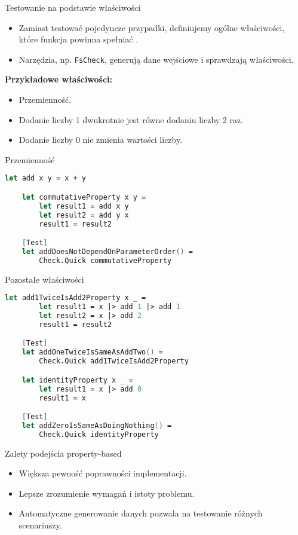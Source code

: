\begin{frame}{Testowanie na podstawie właściwości}
    \begin{itemize}
        \item Zamiast testować pojedyncze przypadki, definiujemy ogólne właściwości, które funkcja powinna spełniać \cite{pbt_bib}.
        \item Narzędzia, np. \texttt{FsCheck}, generują dane wejściowe i sprawdzają właściwości.
    \end{itemize}
    \textbf{Przykładowe właściwości:}
    \begin{itemize}
        \item Przemienność.
        \item Dodanie liczby 1 dwukrotnie jest równe dodaniu liczby 2 raz.
        \item Dodanie liczby 0 nie zmienia wartości liczby.
    \end{itemize}
\end{frame}


\begin{frame}[fragile]{Przemienność}
    \begin{lstlisting}[language=FSharp, xleftmargin=-10pt,xrightmargin=-10pt,numbers=none]
    let add x y = x + y

    let commutativeProperty x y =
        let result1 = add x y
        let result2 = add y x 
        result1 = result2

    [Test]
    let addDoesNotDependOnParameterOrder() =
        Check.Quick commutativeProperty
    \end{lstlisting}
\end{frame}

\begin{frame}[fragile]{Pozostałe właściwości}
    \begin{lstlisting}[language=FSharp, xleftmargin=-10pt,xrightmargin=-10pt,numbers=none, basicstyle=\ttfamily\small]
    let add1TwiceIsAdd2Property x _ =
        let result1 = x |> add 1 |> add 1
        let result2 = x |> add 2
        result1 = result2

    [Test]
    let addOneTwiceIsSameAsAddTwo() =
        Check.Quick add1TwiceIsAdd2Property

    let identityProperty x _ =
        let result1 = x |> add 0
        result1 = x

    [Test]
    let addZeroIsSameAsDoingNothing() =
        Check.Quick identityProperty
    \end{lstlisting}
\end{frame}

\begin{frame}{Zalety podejścia property-based}
    \begin{itemize}
        \item Większa pewność poprawności implementacji.
        \item Lepsze zrozumienie wymagań i istoty problemu.
        \item Automatyczne generowanie danych pozwala na testowanie różnych scenariuszy.
    \end{itemize}
\end{frame}